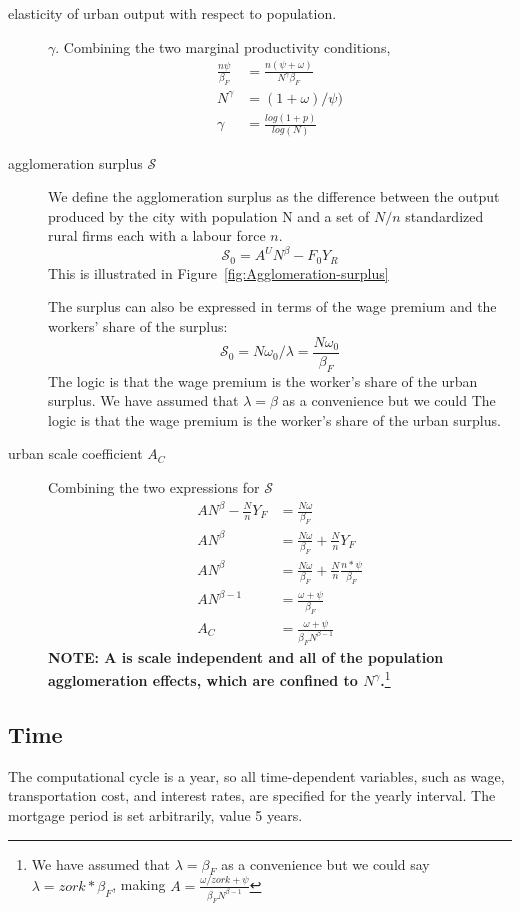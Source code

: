 \begin{description}
\item[elasticity of urban output with respect to population.] $\gamma$. Combining the two marginal productivity conditions, 
\begin{align}
\frac{n\psi}{\beta_F}  &= \frac{n(\psi+\omega)}{N^\gamma \beta_F}  \\
N^\gamma &= (1+\omega)/\psi)\\
\gamma &= \frac{log(1+p)}{log(N)}
\end{align}

\item [agglomeration surplus $\mathcal{S}$] We define the agglomeration surplus as the difference between the output produced by  the city with population N and a set of $N/n$ standardized rural firms each with a labour force $n$. 
\[\mathcal{S_0}=A^U N^\beta-F_0Y_R \] 
This is illustrated in Figure~\ref{fig:Agglomeration-surplus}

The surplus can also be expressed in terms of the wage premium and the workers' share of the surplus:
\[\mathcal{S_0}=N\omega_0/\lambda=\frac{N\omega_0}{\beta_F}\] 
The logic is that the wage premium is the worker's share of the urban surplus. We have assumed that $\lambda=\beta$ as a convenience but we could 
The logic is that the wage premium is the worker's share of the urban surplus. 

\item[urban scale coefficient $A_C$] Combining the two expressions for $\mathcal{S}$
\begin{align*}
 AN^\beta-\frac{N}{n}Y_F    &=\frac{N\omega}{\beta_F}\\ 
 AN^\beta   &=\frac{N\omega}{\beta_F} + \frac{N}{n}Y_F \\
 AN^\beta   &=\frac{N\omega}{\beta_F} + \frac{N}{n}\frac{n*\psi}{\beta_F}\\
AN^{\beta-1}   &=\frac{\omega+\psi}{\beta_F}\\ 
  A_C&=\frac{\omega+\psi}{\beta_FN^{\beta-1}}
\end{align*}
\textbf{NOTE: A is scale independent and all of the population agglomeration effects, which are confined to $N^\gamma$.}\footnote{We have assumed that $\lambda=\beta_F$ as a convenience but we could say $\lambda=zork*\beta_F$, making $A=\frac{\omega/zork +\psi}{\beta_FN^{\beta-1}}$ }
\end{description}


\subsection{Time}
 The computational cycle is a year, so all time-dependent variables, such as wage, transportation cost, and interest rates, are specified for the yearly interval. The mortgage period is set arbitrarily, value 5 years. 




